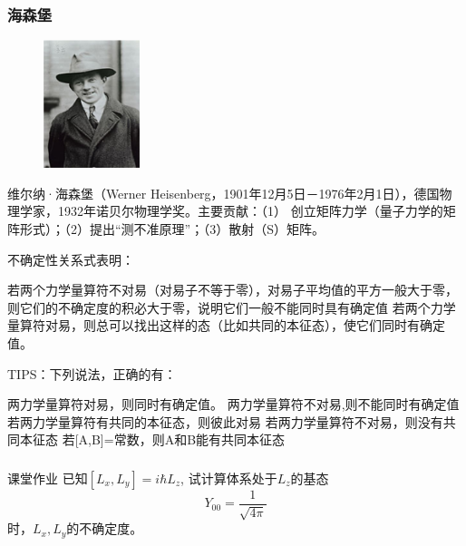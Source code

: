 \begin{frame}
    \frametitle{海森堡}
    \begin{figure} %
        \includegraphics[width=0.25\textwidth]{figs/hesb.png}   
    \end{figure}
    维尔纳·海森堡（Werner Heisenberg，1901年12月5日－1976年2月1日），德国物理学家，1932年诺贝尔物理学奖。主要贡献：（1） 创立矩阵力学（量子力学的矩阵形式）；（2）提出“测不准原理”；（3）散射（S）矩阵。  
\end{frame}

\begin{frame} [allowframebreaks=]
    \begin{tcolorbox2}{不确定性关系式表明：}
    \begin{itemize}
        \Item 若两个力学量算符不对易（对易子不等于零），对易子平均值的平方一般大于零，则它们的不确定度的积必大于零，说明它们一般不能同时具有确定值
        \Item 若两个力学量算符对易，则总可以找出这样的态（比如共同的本征态），使它们同时有确定值。 
    \end{itemize}   
    \end{tcolorbox2}
\end{frame} 

\begin{frame} [allowframebreaks=]
    TIPS：下列说法，正确的有：
    \begin{enumerate}
        \Item 两力学量算符对易，则同时有确定值。 
        \Item 两力学量算符不对易,则不能同时有确定值 
        \Item 若两力学量算符有共同的本征态，则彼此对易
        \Item 若两力学量算符不对易，则没有共同本征态
        \Item 若[A,B]=常数，则A和B能有共同本征态
    \end{enumerate} 
\end{frame} 

\begin{frame} 
    \frametitle{}
    \begin{tcolorbox2}{课堂作业}
    已知$[L_x, L_y]=i\hbar L_z$, 试计算体系处于$L_z$的基态 $$Y_{00}=\frac{1}{\sqrt{4\pi}}$$时，$L_x, L_y$的不确定度。
    \end{tcolorbox2}
\end{frame} 

